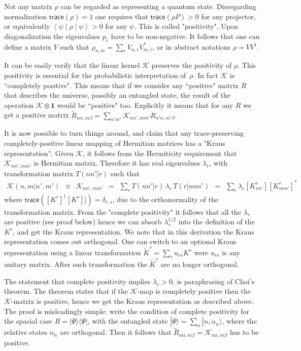 \documentclass[onecolumn,fleqn]{revtex4}
\newcommand{\trc}{\mathsf{trace}}
\newcommand{\BraKet}[3]{\left\langle #1 \middle| #2 \middle| #3 \right\rangle}
\newcommand{\beq}{\begin{eqnarray}}
\newcommand{\eeq}{\end{eqnarray}}
\begin{document}
Not any matrix $\rho$ can be regarded as representing a quantum state. 
Disregarding normalization ${\trc(\rho)=1}$ one requires that ${\trc(\rho P)>0}$ for any projector, 
or equivalently ${\BraKet{\psi}{\rho}{\psi}>0}$ for any $\psi$.
This is called "positivity". Upon diagonalization the eigenvalues $p_r$ have to be non-negative. 
It follows that one can define a matrix $V$ such that ${\rho_{n,m} = \sum_r V_{n,r} V_{m,r}^*}$, 
or in abstract notations ${\rho = VV^{\dag}}$.          


It can be easily verify that the linear kernel $\mathcal{K}$ preserves the positivity of $\rho$. 
This positivity is essential for the probabilistic interpretation of~$\rho$. 
In fact $\mathcal{K}$ is ``completely positive". 
This means that if we consider any ``positive" matrix $R$ that describes the universe, 
possibly an entangled state, the result of the operation ${\mathcal{K} \otimes \bm{1}}$ 
would be ``positive" too. Explicitly it means that for any $R$ we get  
a positive matrix ${\tilde{R}_{n\alpha,m\beta} = \sum_{n'm'} \mathcal{K}_{nn',mm'} R_{n'\alpha,m'\beta}}$.


It is now possible to turn things around, and claim 
that any trace-preserving completely-positive linear mapping
of Hermitian matrices has a "Kraus representation". 
Given $\mathcal{K}$, it follows from the Hermiticity 
requirement that ${\mathcal{K}_{nn',mm'}}$ is Hermitian matrix. 
Therefore it has real eigenvalues $\lambda_r$, 
with transformation matrix $T(nn'|r)$ such that   
\beq
\mathcal{K}(n,m|n',m') \ \ \equiv \ \  \mathcal{K}_{nn',mm'}
\ \ = \ \ \sum_r  T(nn'|r) \, \lambda_r \, T(r|mm')
\ \ = \ \ \sum_r  \lambda_r [K^r_{nn'}] [K^r_{mm'}]^*
\eeq
where $\trc([K^r]^{\dag}[K^s]])=\delta_{r,s}$, 
due to the orthonormality of the transformation matrix. 
From the "complete positivity" it follows that all the $\lambda_r$ 
are positive (see proof below) hence we can absorb $\lambda_r^{1/2}$
into the definition of the $K^r$, and get the Kraus representation. 
We note that in this derivation the Kraus representation comes  
out orthogonal. One can switch to an optional Kraus representation 
using a linear transformation ${\tilde{K}^r = \sum_{s} u_{rs} K^s}$  
were $u_{rs}$ is any unitary matrix. After such transformation 
the $\tilde{K}^r$ are no longer orthogonal. 


The statement that complete positivity implies ${\lambda_r>0}$,  
is paraphrasing of Choi's theorem. The theorem states 
that if the $\mathcal{K}$-map is completely positive
then the $\mathcal{K}$-matrix is positive, 
hence we get the Kraus representation as described above.
The proof is misleadingly simple: write the condition of 
complete positivity for the spacial case ${R = |\Psi\rangle \langle \Psi| }$, 
with the entangled state ${|\Psi\rangle = \sum_n |n,\alpha_n \rangle }$, 
where the relative states ${\alpha_n}$ are orthogonal. 
Then it follows that ${\tilde{R}_{n\alpha,m\beta} = \mathcal{K}_{n\alpha,m\beta}}$ 
has to be positive.      
  
\end{document}
